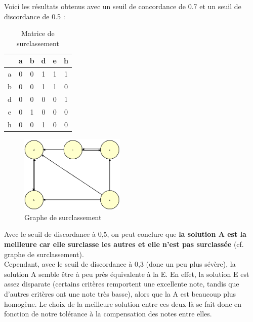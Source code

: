 \documentclass[paper=a4, fontsize=11pt]{report}
\numberwithin{equation}{section}		%
\numberwithin{figure}{section}			%
\numberwithin{table}{section}				%
\begin{document}
Voici les résultats obtenus avec un seuil de concordance de 0.7 et un seuil de discordance de 0.5 : 
\begin{multicols}{2}

\begin{table}[H]
\begin{center}
\begin{tabular}{c|ccccc}
 & a & b & d & e & h \\ 
\hline 
a & 0 & 0 & 1 & 1 & 1 \\ 
b & 0 & 0 & 1 & 1 & 0 \\ 
d & 0 & 0 & 0 & 0 & 1 \\ 
e & 0 & 1 & 0 & 0 & 0 \\ 
h & 0 & 0 & 1 & 0 & 0\\ 
\end{tabular} 
\caption{Matrice de surclassement} 
\end{center}
\end{table}
\begin{figure}[H]
\centering
\includegraphics[width=5cm]{figures/GraphDeSurClassement.png}
\caption{Graphe de surclassement}
\end{figure}
\end{multicols}

Avec le seuil de discordance à 0,5, on peut conclure que \textbf{la solution A est la meilleure car elle surclasse les autres et elle n'est pas surclassée} (cf. graphe de surclassement).\\

Cependant, avec le seuil de discordance à 0,3 (donc un peu plus sévère), la solution A semble être à peu près équivalente à la E. En effet, la solution E est assez disparate (certains critères remportent une excellente note, tandis que d’autres critères ont une note très basse), alors que la A est beaucoup plus homogène. Le choix de la meilleure solution entre ces deux-là se fait donc en fonction de notre tolérance à la compensation des notes entre elles.


\begin{appendices} 
\lstlistoflistings






\newpage

\newpage


\end{appendices} 

\end{document}
